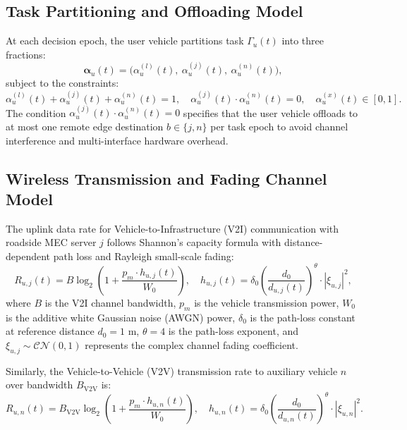 \documentclass[12pt,a4paper]{article}
\begin{document}
\subsection{Task Partitioning and Offloading Model}
At each decision epoch, the user vehicle partitions task $\Gamma_u(t)$ into three fractions:
\begin{equation}
\mathbf{\alpha}_u(t) = \big(\alpha_u^{(l)}(t),\ \alpha_u^{(j)}(t),\ \alpha_u^{(n)}(t)\big),
\label{eq:alpha_vector}
\end{equation}
subject to the constraints:
\begin{equation}
\alpha_u^{(l)}(t) + \alpha_u^{(j)}(t) + \alpha_u^{(n)}(t) = 1, \quad \alpha_u^{(j)}(t) \cdot \alpha_u^{(n)}(t) = 0, \quad \alpha_u^{(x)}(t) \in [0, 1].
\label{eq:alpha_constraints}
\end{equation}
The condition $\alpha_u^{(j)}(t) \cdot \alpha_u^{(n)}(t) = 0$ specifies that the user vehicle offloads to at most one remote edge destination $b \in \{j, n\}$ per task epoch to avoid channel interference and multi-interface hardware overhead.

\subsection{Wireless Transmission and Fading Channel Model}
The uplink data rate for Vehicle-to-Infrastructure (V2I) communication with roadside MEC server $j$ follows Shannon's capacity formula with distance-dependent path loss and Rayleigh small-scale fading:
\begin{equation}
R_{u,j}(t) = B \log_2 \left( 1 + \frac{p_m \cdot h_{u,j}(t)}{W_0} \right), \quad h_{u,j}(t) = \delta_0 \left( \frac{d_0}{d_{u,j}(t)} \right)^\theta \cdot |\xi_{u,j}|^2,
\label{eq:rate_v2i}
\end{equation}
where $B$ is the V2I channel bandwidth, $p_m$ is the vehicle transmission power, $W_0$ is the additive white Gaussian noise (AWGN) power, $\delta_0$ is the path-loss constant at reference distance $d_0 = 1$ m, $\theta = 4$ is the path-loss exponent, and $\xi_{u,j} \sim \mathcal{CN}(0, 1)$ represents the complex channel fading coefficient.

Similarly, the Vehicle-to-Vehicle (V2V) transmission rate to auxiliary vehicle $n$ over bandwidth $B_{\mathrm{V2V}}$ is:
\begin{equation}
R_{u,n}(t) = B_{\mathrm{V2V}} \log_2 \left( 1 + \frac{p_m \cdot h_{u,n}(t)}{W_0} \right), \quad h_{u,n}(t) = \delta_0 \left( \frac{d_0}{d_{u,n}(t)} \right)^\theta \cdot |\xi_{u,n}|^2.
\label{eq:rate_v2v}
\end{equation}
\end{document}

